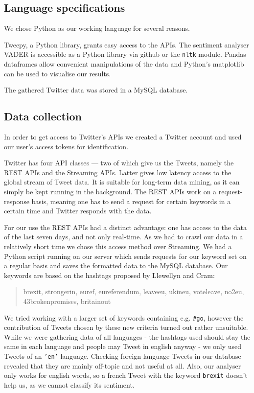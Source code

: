 \documentclass{emulateapj}
\begin{document}
\subsection{Language specifications}
We chose Python as our working language for several reasons.

Tweepy\cite{tweepy}, a Python library, grants easy access to the APIs. The sentiment analyser VADER is accessible as a Python library via github or the \texttt{nltk} module.
Pandas dataframes allow convenient manipulations of the data and Python's matplotlib can be used to visualise our results.

The gathered Twitter data was stored in a MySQL database.

\subsection{Data collection}

In order to get access to Twitter's APIs we created a Twitter account and used our user's access tokens for identification.

Twitter has four API classes --- two of which give us the Tweets, namely the REST APIs\cite{rest-apis} and the Streaming APIs\cite{streaming-apis}.
Latter gives low latency access to the global stream of Tweet data. It is suitable for long-term data mining, as it can simply be kept running in the background.
The REST APIs work on a request-response basis, meaning one has to send a request for certain keywords in a certain time and Twitter responds with the data. 

For our use the REST APIs had a distinct advantage: one has access to the data of the last seven days, and not only real-time.
As we had to crawl our data in a relatively short time we chose this access method over Streaming.
We had a Python script running on our server which sends requests for our keyword set on a regular basis and saves the formatted data to the MySQL database.
Our keywords are based on the hashtags proposed by Llewellyn and Cram\cite{llewllyn16}:
\begin{quote}
{\ttfamily
brexit, strongerin, euref, eureferendum, leaveeu, ukineu, voteleave, no2eu, 43brokenpromises, britainout
}
\end{quote}
We tried working with a larger set of keywords containing e.g. \texttt{\#go}, however the contribution of Tweets chosen by these new criteria 
turned out rather unsuitable. While we were gathering data of all languages - the hashtags used should stay the same in each language
and people may Tweet in english anyway - we only used Tweets of an \texttt{'en'} language. Checking foreign language Tweets in our database revealed that
they are mainly off-topic and not useful at all. Also, our analyser only works for english words, so a french Tweet with the keyword \texttt{brexit} doesn't help
us, as we cannot classify its sentiment.
\end{document}
